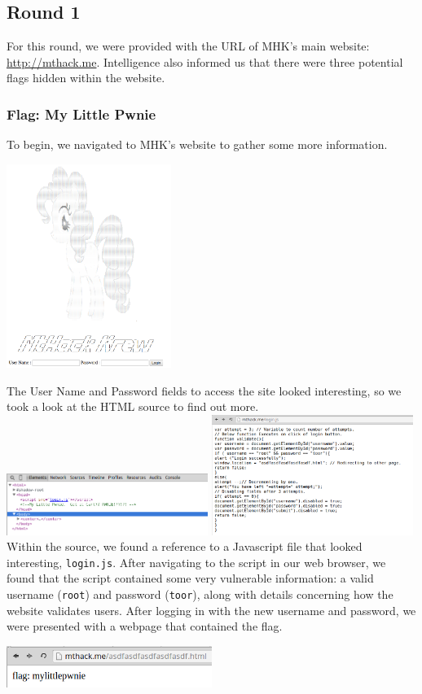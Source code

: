 \documentclass[10pt,a4paper,titlepage]{article}
\begin{document}
\subsection{Round 1}
For this round, we were provided with the URL of MHK's main website: \url{http://mthack.me}. Intelligence\cite{test} also informed us that there were three potential flags hidden within the website.
\subsubsection{Flag: My Little Pwnie}
To begin, we navigated to MHK's website to gather some more information. \\
\begin{center}
\includegraphics[width=0.4\textwidth]{mthack_flags/mylittlepwnie/web}
\end{center}
The User Name and Password fields to access the site looked interesting, so we took a look at the HTML source to find out more. \\
\includegraphics[width=0.49\textwidth]{mthack_flags/mylittlepwnie/source}
\includegraphics[width=0.49\textwidth]{mthack_flags/mylittlepwnie/js} \\
Within the source, we found a reference to a Javascript file that looked interesting, \texttt{login.js}. After navigating to the script in our web browser, we found that the script contained some very vulnerable information: a valid username (\texttt{root}) and password (\texttt{toor}), along with details concerning how the website validates users. After logging in with the new username and password, we were presented with a webpage that contained the flag.
\begin{center}
\includegraphics[width=0.5\textwidth]{mthack_flags/mylittlepwnie/flag}
\end{center}
\end{document}
